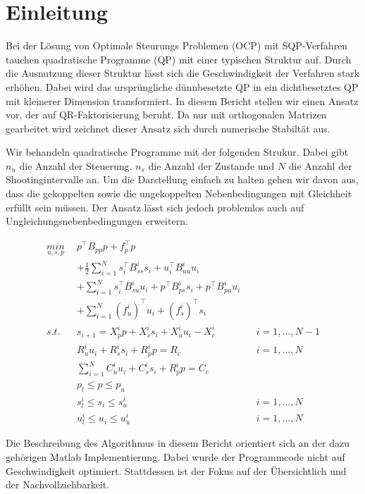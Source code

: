 \section{Einleitung}
Bei der Lösung von Optimale Steurungs Problemen (OCP) mit SQP-Verfahren tauchen quadratische Programme (QP)  mit einer typischen Struktur auf. Durch die Ausnutzung dieser Struktur lässt sich die Geschwindigkeit der Verfahren stark erhöhen. Dabei wird das ursprüngliche dünnbesetzte QP in ein dichtbesetztes QP mit kleinerer Dimension transformiert. In diesem Bericht stellen wir einen Ansatz vor, der auf QR-Faktorisierung beruht. Da nur mit orthogonalen Matrizen gearbeitet wird zeichnet dieser Ansatz sich durch numerische Stabiltät aus.

Wir behandeln quadratische Programme mit der folgenden Strukur. Dabei gibt $n_u$ die Anzahl der Steuerung, $n_s$ die Anzahl der Zustande und $N$ die Anzahl der Shootingintervalle an. Um die Darstellung einfach zu halten gehen wir davon aus, dass die gekoppelten sowie die ungekoppelten Nebenbedingungen mit Gleichheit erfüllt sein müssen. Der Ansatz lässt sich jedoch problemlos auch auf Ungleichungsnebenbedingungen erweitern.

\begin{align*}
\underset{u,s,p}{min}\ \	&p^\top B_{pp} p+f_p^\top p  \\ 
						&+\frac{1}{2}\sum_{i=1}^{N} s_i^\top B_{ss}^i s_i+u_i^\top B_{uu}^i u_i \\
						&+\sum_{i=1}^{N} s_i^\top B^i_{su} u_i+p^\top B_{ps}^i s_i +p^\top B_{pu}^i u_i  \\
						&+\sum_{i=1}^{N} (f_u^i)^\top u_i+(f_s^i)^\top s_i \\
s.t. 	\ \				&s_{i+1}=X_p^i p +X_s^i s_i + X_u^i u_i -X_c^i  		&& i=1,\hdots,N-1\\
						& R_u^i u_i + R_s^i s_i+R_p^i p =R_c   		&& i=1,\hdots,N \\
						& \sum_{i=1}^{N} C_u^i u_i + C_s^i s_i + R_p^i p = C_c \\
						& p_l \leq p \leq p_u \\
						& s_l^i \leq s_i \leq s_u^i && i=1,\hdots,N \\ 
						& u_l^i \leq u_i  \leq u_u^i  && i=1,\hdots,N
\end{align*}

Die Beschreibung des Algorithmus in diesem Bericht orientiert sich an der dazu gehörigen Matlab Implementierung. Dabei wurde der Programmcode nicht auf Geschwindigkeit optimiert. Stattdessen ist der Fokus auf der Übersichtlich und der Nachvollziehbarkeit.
